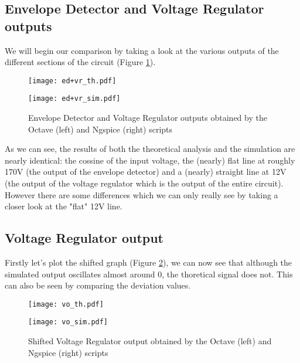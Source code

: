 \subsection{Envelope Detector and Voltage Regulator outputs}
\hspace{12pt} We will begin our comparison by taking a look at the various outputs of the different sections of the circuit (Figure \ref{fig:ed+vr_comp}).

\begin{figure}[h]
	\begin{minipage}{.45\textwidth}
		\centering
        	\texttt{[image: ed+vr\_th.pdf]}
	\end{minipage}
	\begin{minipage}{.45\textwidth}
		\centering
		\texttt{[image: ed+vr\_sim.pdf]}
	\end{minipage}
	\vspace{-5pt}
	\caption{Envelope Detector and Voltage Regulator outputs obtained by the Octave (left) and Ngspice (right) scripts}
	\label{fig:ed+vr_comp}
\end{figure}

As we can see, the results of both the theoretical analysis and the simulation are nearly identical: the cossine of the input voltage, the (nearly) flat line at roughly 170V (the output of the envelope detector) and a (nearly) straight line at 12V (the output of the voltage regulator which is the output of the entire circuit). However there are some differences which we can only really see by taking a closer look at the "flat" 12V line.

\subsection{Voltage Regulator output}
\hspace{12pt} Firstly let's plot the shifted graph (Figure \ref{fig:vo_comp}), we can now see that although the simulated output oscillates almost around 0, the thoretical signal does not. This can also be seen by comparing the deviation values. 

\begin{figure}[h]
	\begin{minipage}{.4\textwidth}
		\centering
        	\texttt{[image: vo\_th.pdf]}
	\end{minipage}
	\begin{minipage}{.4\textwidth}
		\centering
		\texttt{[image: vo\_sim.pdf]}
	\end{minipage}
	\caption{Shifted Voltage Regulator output obtained by the Octave (left) and Ngspice (right) scripts}
	\label{fig:vo_comp}
\end{figure}

